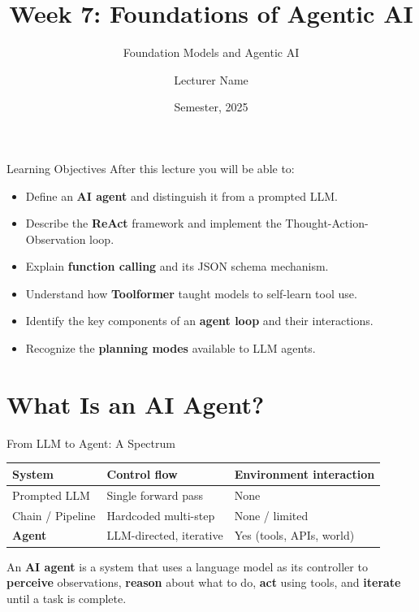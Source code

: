 \documentclass[aspectratio=169,10pt]{beamer}
\title{Week 7: Foundations of Agentic AI}
\subtitle{Foundation Models and Agentic AI}
\author{Lecturer Name}
\institute{Holon Institute of Technology (HIT)}
\date{Semester, 2025}
\begin{document}
\begin{frame}
  \titlepage
\end{frame}

\begin{frame}{Learning Objectives}
  After this lecture you will be able to:
  \begin{itemize}
    \item Define an \textbf{AI agent} and distinguish it from a prompted LLM.
    \item Describe the \textbf{ReAct} framework and implement the Thought-Action-Observation loop.
    \item Explain \textbf{function calling} and its JSON schema mechanism.
    \item Understand how \textbf{Toolformer} taught models to self-learn tool use.
    \item Identify the key components of an \textbf{agent loop} and their interactions.
    \item Recognize the \textbf{planning modes} available to LLM agents.
  \end{itemize}
\end{frame}

\section{What Is an AI Agent?}

\begin{frame}{From LLM to Agent: A Spectrum}
  \begin{center}
  \begin{tabular}{lll}
    \toprule
    \textbf{System} & \textbf{Control flow} & \textbf{Environment interaction} \\
    \midrule
    Prompted LLM & Single forward pass & None \\
    Chain / Pipeline & Hardcoded multi-step & None / limited \\
    \textbf{Agent} & LLM-directed, iterative & Yes (tools, APIs, world) \\
    \bottomrule
  \end{tabular}
  \end{center}
  \vspace{0.5em}
  \begin{tcolorbox}[hitbox, title=Definition]
    An \textbf{AI agent} is a system that uses a language model as its controller to
    \textbf{perceive} observations, \textbf{reason} about what to do, \textbf{act} using tools,
    and \textbf{iterate} until a task is complete.
  \end{tcolorbox}
\end{frame}
\end{document}
